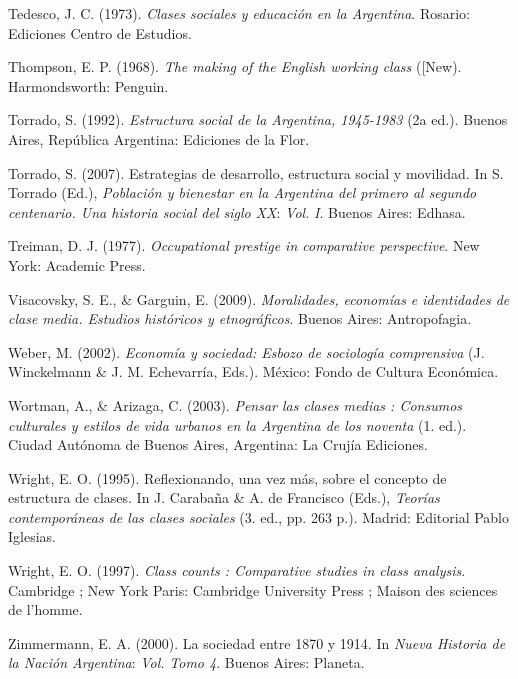 \documentclass[
]{article}
\newlength{\cslhangindent}
\newlength{\cslentryspacingunit} %
\newenvironment{CSLReferences}[2] %
 {%
  \setlength{\parindent}{0pt}
  \ifodd #1
  \let\oldpar\par
  \def\par{\hangindent=\cslhangindent\oldpar}
  \fi
  \setlength{\parskip}{#2\cslentryspacingunit}
 }%
 {}
\begin{document}
\begin{CSLReferences}{1}{0}
\leavevmode{}%
Tedesco, J. C. (1973). \emph{Clases sociales y educación en la {Argentina}}. Rosario: Ediciones Centro de Estudios.

\leavevmode{}%
Thompson, E. P. (1968). \emph{The making of the {English} working class} ({[}New). Harmondsworth: Penguin.

\leavevmode{}%
Torrado, S. (1992). \emph{Estructura social de la {Argentina}, 1945-1983} (2a ed.). Buenos Aires, República Argentina: Ediciones de la Flor.

\leavevmode{}%
Torrado, S. (2007). Estrategias de desarrollo, estructura social y movilidad. In S. Torrado (Ed.), \emph{Población y bienestar en la {Argentina} del primero al segundo centenario. {Una} historia social del siglo {XX}}: \emph{Vol.} \emph{I}. Buenos Aires: Edhasa.

\leavevmode{}%
Treiman, D. J. (1977). \emph{Occupational prestige in comparative perspective}. New York: Academic Press.

\leavevmode{}%
Visacovsky, S. E., \& Garguin, E. (2009). \emph{Moralidades, economías e identidades de clase media. {Estudios} históricos y etnográficos}. Buenos Aires: Antropofagia.

\leavevmode{}%
Weber, M. (2002). \emph{Economía y sociedad: Esbozo de sociología comprensiva} (J. Winckelmann \& J. M. Echevarría, Eds.). México: Fondo de Cultura Económica.

\leavevmode{}%
Wortman, A., \& Arizaga, C. (2003). \emph{Pensar las clases medias : Consumos culturales y estilos de vida urbanos en la {Argentina} de los noventa} (1. ed.). Ciudad Autónoma de Buenos Aires, Argentina: La Crujía Ediciones.

\leavevmode{}%
Wright, E. O. (1995). Reflexionando, una vez más, sobre el concepto de estructura de clases. In J. Carabaña \& A. de Francisco (Eds.), \emph{Teorías contemporáneas de las clases sociales} (3. ed., pp. 263 p.). Madrid: Editorial Pablo Iglesias.

\leavevmode{}%
Wright, E. O. (1997). \emph{Class counts : Comparative studies in class analysis}. Cambridge ; New York Paris: Cambridge University Press ; Maison des sciences de l'homme.

\leavevmode{}%
Zimmermann, E. A. (2000). La sociedad entre 1870 y 1914. In \emph{Nueva {Historia} de la {Nación} {Argentina}}: \emph{Vol.} \emph{Tomo 4}. Buenos Aires: Planeta.

\end{CSLReferences}
\end{document}
